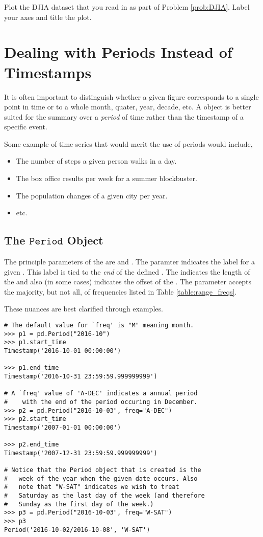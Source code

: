 \begin{problem}
Plot the DJIA dataset that you read in as part of Problem \ref{prob:DJIA}. Label your axes and title the plot.
\end{problem}

\section*{Dealing with Periods Instead of Timestamps}
It is often important to distinguish whether a given figure corresponds to a single point in time or to a whole month, quater, year, decade, etc. A  object is better suited for the summary over a \emph{period} of time rather than the timestamp of a specific event.

Some example of time series that would merit the use of periods would include,
\begin{itemize}
    \item The number of steps a given person walks in a day.
    \item The box office results per week for a summer blockbuster.
    \item The population changes of a given city per year.
    \item etc.
\end{itemize}

\subsection*{The $\texttt{Period}$ Object}
The principle parameters of the  are  and . The  paramter indicates the label for a given . This label is tied to the \emph{end} of the defined . The  indicates the length of the  and also (in some cases) indicates the offset of the . The  parameter accepts the majority, but not all, of frequencies listed in Table \ref{table:range_freqs}.

These nuances are best clarified through examples.

\begin{lstlisting}
# The default value for `freq' is "M" meaning month.
>>> p1 = pd.Period("2016-10")
>>> p1.start_time
Timestamp('2016-10-01 00:00:00')

>>> p1.end_time
Timestamp('2016-10-31 23:59:59.999999999')

# A `freq' value of 'A-DEC' indicates a annual period
#    with the end of the period occuring in December.
>>> p2 = pd.Period("2016-10-03", freq="A-DEC")
>>> p2.start_time
Timestamp('2007-01-01 00:00:00')

>>> p2.end_time
Timestamp('2007-12-31 23:59:59.999999999')

# Notice that the Period object that is created is the
#   week of the year when the given date occurs. Also
#   note that "W-SAT" indicates we wish to treat
#   Saturday as the last day of the week (and therefore
#   Sunday as the first day of the week.)
>>> p3 = pd.Period("2016-10-03", freq="W-SAT")
>>> p3
Period('2016-10-02/2016-10-08', 'W-SAT')
\end{lstlisting}

